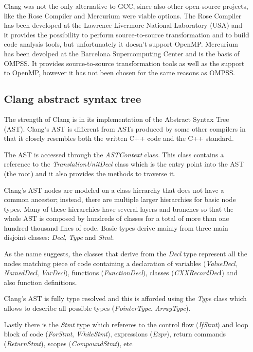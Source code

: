 \documentclass[a4paper,12pt,oneside]{book}
\begin{document}
Clang was not the only alternative to GCC, since also other open-source projects, like the Rose Compiler \cite{rose} and Mercurium \cite{mercurium} were viable options. The Rose Compiler has been developed at the Lawrence Livermore National Laboratory (USA) and it provides the possibility to perform source-to-source transformation and to build code analysis tools, but unfortunately it doesn't support OpenMP. Mercurium has been devolped at the Barcelona Supercomputing Center and is the basis of OMPSS. It provides source-to-source transformation tools as well as the support to OpenMP, however it has not been chosen for the same reasons as OMPSS. 

\subsection{Clang abstract syntax tree}
The strength of Clang is in its implementation of the Abstract Syntax Tree (AST). Clang’s AST is different from ASTs produced by some other compilers in that it closely resembles both the written C++ code and the C++ standard.

The AST is accessed through the \emph{ASTContext} class. This class contains a reference to the \emph{TranslationUnitDecl} class which is the entry point into the AST (the root) and it also provides the methods to traverse it.

Clang’s AST nodes are modeled on a class hierarchy that does not have a common ancestor; instead, there are multiple larger hierarchies for basic node types. Many of these hierarchies have several layers and branches so that the whole AST is composed by hundreds of classes for a total of more than one hundred thousand lines of code. Basic types derive mainly from three main disjoint classes: \emph{Decl}, \emph{Type} and \emph{Stmt}. 

As the name suggests, the classes that derive from the \emph{Decl} type represent all the nodes matching piece of code containing a declaration of variables (\emph{ValueDecl}, \emph{NamedDecl}, \emph{VarDecl}), functions (\emph{FunctionDecl}), classes (\emph{CXXRecordDec}l) and also function definitions.

Clang’s AST is fully type resolved and this is afforded using the \emph{Type} class which allows to describe all possible types (\emph{PointerType}, \emph{ArrayType}).

Lastly there is the \emph{Stmt} type which refereres to the control flow (\emph{IfStmt}) and loop block of code (\emph{ForStmt}, \emph{WhileStmt}), expressions (\emph{Expr}), return commands (\emph{ReturnStmt}), scopes (\emph{CompoundStmt}), etc
\end{document}
